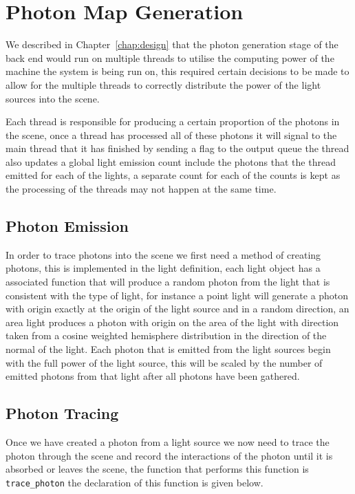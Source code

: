 \section{Photon Map Generation}
We described in Chapter~\ref{chap:design} that the photon generation stage of the back end would run on multiple threads
to utilise the computing power of the machine the system is being run on, this required certain decisions to be made to
allow for the multiple threads to correctly distribute the power of the light sources into the scene.

Each thread is responsible for producing a certain proportion of the photons in the scene, once a thread has processed all
of these photons it will signal to the main thread that it has finished by sending a flag to the output queue the thread also
updates a global light emission count include the photons that the thread emitted for each of the lights, a separate count for
each of the counts is kept as the processing of the threads may not happen at the same time.

\subsection{Photon Emission}
In order to trace photons into the scene we first need a method of creating photons, this is implemented in the light 
definition, each light object has a associated function that will produce a random photon from the light that is consistent with 
the type of light, for instance a point light will generate a photon with origin exactly at the origin of the light source and
in a random direction, an area light produces a photon with origin on the area of the light with direction taken from a
cosine weighted hemisphere distribution in the direction of the normal of the light. Each photon that is emitted from the
light sources begin with the full power of the light source, this will be scaled by the number of emitted photons from
that light after
all photons have been gathered.

\subsection{Photon Tracing}
Once we have created a photon from a light source we now need to trace the photon through the scene and record the interactions
of the photon until it is absorbed or leaves the scene, the function that performs this function is \texttt{trace\_photon} the
declaration of this function is given below.

